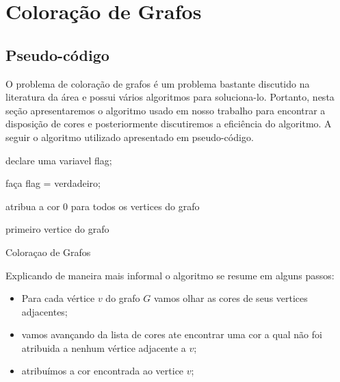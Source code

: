 \documentclass[12pt,openright,oneside,a4paper,brazil]{abntex2}
\begin{document}
\imprimircapa
\newpage
\tableofcontents

\chapter{Coloração de Grafos}

\section{Pseudo-código}

O problema de coloração de grafos é um problema bastante discutido na literatura da área e possui vários algoritmos para soluciona-lo. Portanto, nesta seção apresentaremos o algoritmo usado em nosso trabalho para encontrar a disposição de cores e posteriormente discutiremos a eficiência do algoritmo. A seguir o algoritmo utilizado apresentado em pseudo-código.\linebreak

\begin{algorithm}[H]
\SetAlgoLined
{}
declare uma variavel flag;

faça flag = verdadeiro;

atribua a cor 0 para todos os vertices do grafo\;

primeiro vertice do grafo\; 

\caption{Coloraçao de Grafos}
\end{algorithm}

Explicando de maneira mais informal o algoritmo se resume em alguns passos:
\begin{itemize}
	\item Para cada vértice $v$ do grafo $G$ vamos olhar as cores de seus vertices adjacentes;
	\item vamos avançando da lista de cores ate encontrar uma cor a qual não foi atribuida a nenhum vértice adjacente a $v$;
	\item atribuímos a cor encontrada ao vertice $v$; 
\end{itemize}
\end{document}
